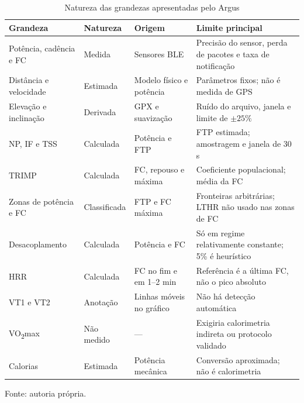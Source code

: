 \begin{table}[htbp]
    \centering
    \caption{Natureza das grandezas apresentadas pelo Argus}
    \label{tab:medido-estimado}
    \footnotesize
    \renewcommand{\arraystretch}{1.12}
    \begin{tabular}{@{}>{\raggedright\arraybackslash}p{2.8cm}
        >{\raggedright\arraybackslash}p{2.2cm}
        >{\raggedright\arraybackslash}p{4.2cm}
        >{\raggedright\arraybackslash}p{5.5cm}@{}}
        \toprule
        \textbf{Grandeza} & \textbf{Natureza} & \textbf{Origem} &
        \textbf{Limite principal} \\
        \midrule
        Potência, cadência e FC & Medida & Sensores BLE &
        Precisão do sensor, perda de pacotes e taxa de notificação \\
        Distância e velocidade & Estimada & Modelo físico e potência &
        Parâmetros fixos; não é medida de GPS \\
        Elevação e inclinação & Derivada & GPX e suavização &
        Ruído do arquivo, janela e limite de $\pm 25\%$ \\
        NP, IF e TSS & Calculada & Potência e FTP &
        FTP estimada; amostragem e janela de 30 s \\
        TRIMP & Calculada & FC, repouso e máxima &
        Coeficiente populacional; média da FC \\
        Zonas de potência e FC & Classificada & FTP e FC máxima &
        Fronteiras arbitrárias; LTHR não usado nas zonas de FC \\
        Desacoplamento & Calculada & Potência e FC &
        Só em regime relativamente constante; 5\% é heurístico \\
        HRR & Calculada & FC no fim e em 1--2 min &
        Referência é a última FC, não o pico absoluto \\
        VT1 e VT2 & Anotação & Linhas móveis no gráfico &
        Não há detecção automática \\
        VO\textsubscript{2}max & Não medido & --- &
        Exigiria calorimetria indireta ou protocolo validado \\
        Calorias & Estimada & Potência mecânica &
        Conversão aproximada; não é calorimetria \\
        \bottomrule
    \end{tabular}
    \vspace{0.2cm}
    \par\small Fonte: autoria própria.
\end{table}

